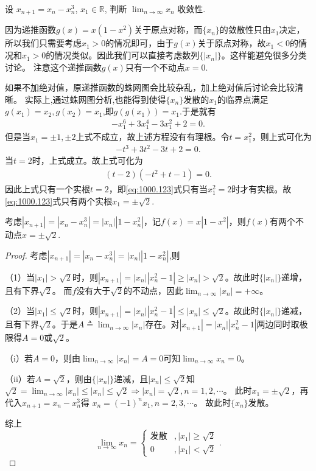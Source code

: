 \documentclass[../../main.tex]{subfiles}
\begin{document}
\begin{example}
设 $x_{n+1} = x_n - x_n^3$, $x_1 \in \mathbb{R}$, 判断 $\lim_{n \to \infty} x_n$ 收敛性.
\end{example}
\begin{note}
因为递推函数$g(x) = x(1 - x^2)$关于原点对称，而$\{ x_n \}$的敛散性只由$x_1$决定，所以我们只需要考虑$x_1 > 0$的情况即可，由于$g(x)$关于原点对称，故$x_1 < 0$的情况和$x_1 > 0$的情况类似。因此我们可以直接考虑数列$\{ |x_n| \}$。这样能避免很多分类讨论。
注意这个递推函数$g(x)$只有一个不动点$x=0$.

如果不加绝对值，原递推函数的蛛网图会比较杂乱，加上绝对值后讨论会比较清晰。
实际上,通过蛛网图分析,也能得到使得$\{x_n\}$发散的$x_1$的临界点满足$g(x_1)=x_2,g(x_2)=x_1$,即$g(g(x_1))=x_1$.于是就有
\begin{align}
-x_1^6 + 3x_1^4 - 3x_1^2 + 2 = 0.\label{eq:1000.123}
\end{align}
但是当$x_1 = \pm 1, \pm 2$上式不成立，故上述方程没有有理根。令$t = x_1^2$，则上式可化为
\begin{align*}
-t^3 + 3t^2 - 3t + 2 = 0.
\end{align*}
当$t = 2$时，上式成立。故上式可化为
\begin{align*}
(t - 2)(-t^2 + t - 1) = 0.
\end{align*}
因此上式只有一个实根$t = 2$，即\eqref{eq:1000.123}式只有当$x_1^2 = 2$时才有实根。故\eqref{eq:1000.123}式只有两个实根$x_1 = \pm \sqrt{2}$.

考虑$|x_{n+1}| = |x_n - x_n^3| = |x_n| |1 - x_n^2|$，记$f(x) = x |1 - x^2|$，则$f(x)$有两个不动点$x=\pm \sqrt{2}.$
\end{note}
\begin{proof}
考虑$|x_{n+1}| = |x_n - x_n^3| = |x_n| |1 - x_n^2|$,则

（1）当$|x_1| > \sqrt{2}$时，则$|x_{n+1}| = |x_n| |x_n^2 - 1| \geqslant |x_n| > \sqrt{2}$。故此时$\{ |x_n| \}$递增，且有下界$\sqrt{2}$。
而$f$没有大于$\sqrt{2}$的不动点，因此$\lim_{n \to \infty} |x_n| = +\infty$。

（2）当$|x_1| \leqslant \sqrt{2}$时，则$|x_{n+1}| = |x_n| |x_n^2 - 1| \leqslant |x_n| \leqslant \sqrt{2}$。故此时$\{ |x_n| \}$递减，且有下界$\sqrt{2}$。于是$A \triangleq \lim_{n \to \infty} |x_n|$存在。对$|x_{n+1}| = |x_n| |x_n^2 - 1|$两边同时取极限得$A = 0$或$\sqrt{2}$。

（i）若$A = 0$，则由$\lim_{n \to \infty} |x_n| = A = 0$可知$\lim_{n \to \infty} x_n = 0$。

（ii）若$A = \sqrt{2}$，则由$\{ |x_n| \}$递减，且$|x_n| \leqslant \sqrt{2}$知
$\sqrt{2} = \lim_{n \to \infty} |x_n| \leqslant |x_n| \leqslant \sqrt{2} \Rightarrow |x_n| = \sqrt{2}, n = 1, 2, \cdots$。
此时$x_1 = \pm \sqrt{2}$，再代入$x_{n+1} = x_n - x_n^3$得
$x_n = (-1)^n x_1, n = 2, 3, \cdots$。
故此时$\{ x_n \}$发散。

综上
$$\lim_{n \to \infty} x_n = \begin{cases} \text{发散}&, |x_1| \geqslant \sqrt{2} \\ 0&,|x_1| < \sqrt{2} \end{cases}.$$
\end{proof}
\end{document}
